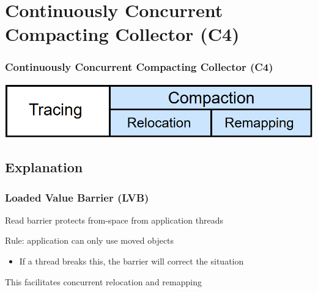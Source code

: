 \documentclass{beamer}
\newcommand{\linespace}{\vskip 0.25cm}
\begin{document}
\section[C4]{Continuously Concurrent Compacting Collector (C4)}

\begin{frame}

\frametitle{Continuously Concurrent Compacting Collector (C4)}

\begin{center}
\includegraphics[width=.85\textwidth]{Illustrations/gc_cycle_locator_compaction.png}
\end{center}

\end{frame}



\subsection*{Explanation}

\begin{frame}

\frametitle{Loaded Value Barrier (LVB)}

Read barrier protects from-space from application threads

\linespace
\linespace

Rule: application can only use moved objects
\begin{itemize}
\item If a thread breaks this, the barrier will correct the situation
\end{itemize}

\linespace
\linespace

This facilitates concurrent relocation and remapping

\end{frame}
\end{document}
